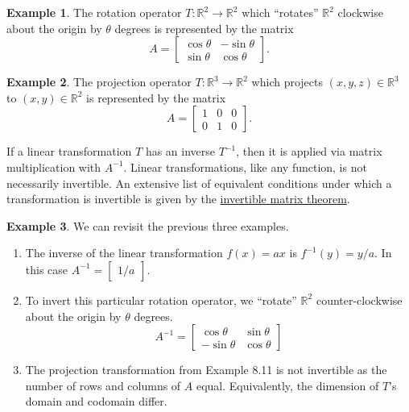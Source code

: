 \documentclass{article}
\newcommand{\R}{\mathbb{R}}
\theoremstyle{definition}
\newtheorem{example}{Example}[section]
\begin{document}
	\begin{example}
		The rotation operator $ T:\R^2\to\R^2 $ which ``rotates'' $ \R^2 $ clockwise about the origin by $ \theta $ degrees is represented by the matrix $$ A = \begin{bmatrix}
			\cos\theta & -\sin\theta \\\sin\theta&\cos\theta
		\end{bmatrix}.$$
	\end{example}
	\begin{example}
		The projection operator $ T:\R^3\to\R^2 $ which projects $ (x,y,z)\in\R^3 $ to $ (x,y)\in\R^2 $ is represented by the matrix 
		$$ A = \begin{bmatrix}
			1&0&0\\0&1&0
		\end{bmatrix}.$$
	\end{example}
	If a linear transformation $ T $ has an inverse $ T^{-1} $, then it is applied via matrix multiplication with $ A^{-1} $. Linear transformations, like any function, is not necessarily invertible. An extensive list of equivalent conditions under which a transformation is invertible is given by the \href{https://mathworld.wolfram.com/InvertibleMatrixTheorem.html}{invertible matrix theorem}.
	\begin{example} We can revisit the previous three examples. 
		\begin{enumerate}
			\item The inverse of the linear transformation $ f(x)=ax $ is $ f^{-1}(y)=y/a $. In this case $ A^{-1}=\begin{bmatrix}
				1/a
			\end{bmatrix} $. 
			\item To invert this particular rotation operator, we ``rotate'' $ \R^2 $ counter-clockwise about the origin by $ \theta $ degrees. 
			$$ A^{-1}= \begin{bmatrix}
				\cos\theta & \sin\theta \\-\sin\theta&\cos\theta
			\end{bmatrix}$$
			\item The projection transformation from Example 8.11 is not invertible as the number of rows and columns of $ A $  equal. Equivalently, the dimension of $ T $'s domain and codomain differ.
		\end{enumerate}
	\end{example}
\end{document}

